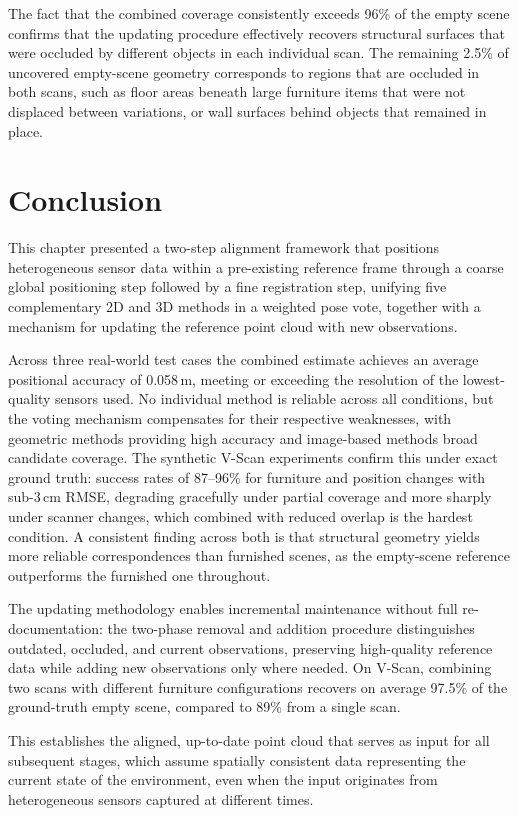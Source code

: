 The fact that the combined coverage consistently exceeds 96\% of the empty scene confirms that the updating procedure effectively recovers structural surfaces that were occluded by different objects in each individual scan. The remaining 2.5\% of uncovered empty-scene geometry corresponds to regions that are occluded in both scans, such as floor areas beneath large furniture items that were not displaced between variations, or wall surfaces behind objects that remained in place.

\section{Conclusion}
\label{sec:4_conclusion}

This chapter presented a two-step alignment framework that positions heterogeneous sensor data within a pre-existing reference frame through a coarse global positioning step followed by a fine registration step, unifying five complementary 2D and 3D methods in a weighted pose vote, together with a mechanism for updating the reference point cloud with new observations.

Across three real-world test cases the combined estimate achieves an average positional accuracy of 0.058\,m, meeting or exceeding the resolution of the lowest-quality sensors used. No individual method is reliable across all conditions, but the voting mechanism compensates for their respective weaknesses, with geometric methods providing high accuracy and image-based methods broad candidate coverage. The synthetic V-Scan experiments confirm this under exact ground truth: success rates of 87--96\% for furniture and position changes with sub-3\,cm RMSE, degrading gracefully under partial coverage and more sharply under scanner changes, which combined with reduced overlap is the hardest condition. A consistent finding across both is that structural geometry yields more reliable correspondences than furnished scenes, as the empty-scene reference outperforms the furnished one throughout.

The updating methodology enables incremental maintenance without full re-documentation: the two-phase removal and addition procedure distinguishes outdated, occluded, and current observations, preserving high-quality reference data while adding new observations only where needed. On V-Scan, combining two scans with different furniture configurations recovers on average 97.5\% of the ground-truth empty scene, compared to 89\% from a single scan.

This establishes the aligned, up-to-date point cloud that serves as input for all subsequent stages, which assume spatially consistent data representing the current state of the environment, even when the input originates from heterogeneous sensors captured at different times.


\cleardoublepage